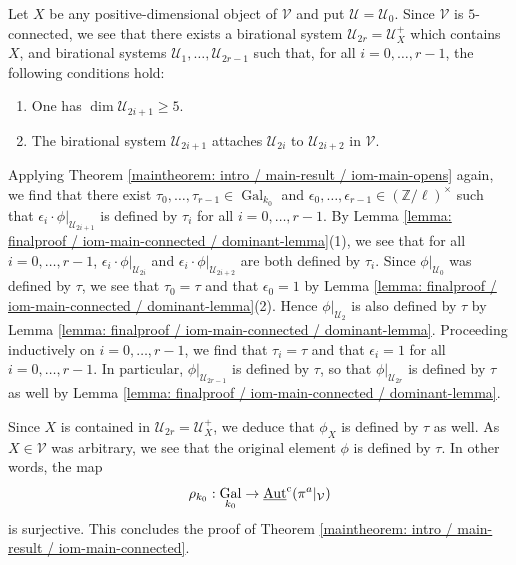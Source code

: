 \documentclass[11pt]{amsart}
\theoremstyle{definition}
\theoremstyle{remark}
\numberwithin{equation}{section}
\DeclareMathOperator{\Aut}{Aut}
\DeclareMathOperator{\Gal}{Gal}
\newcommand{\Z}{\mathbb{Z}}
\newcommand{\Vc}{\mathcal{V}}
\newcommand{\Ucal}{\mathcal{U}}
\newcommand{\UAutc}{\underline{\Aut}^{\rm c}}
\newcommand{\Galk}{{\Gal_{k_0}}}
\begin{document}
Let $X$ be any positive-dimensional object of $\Vc$ and put $\Ucal = \Ucal_0$.
Since $\Vc$ is $5$-connected, we see that there exists a birational system $\Ucal_{2r} = \Ucal_X^+$ which contains $X$, and birational systems $\Ucal_1,\ldots,\Ucal_{2r-1}$ such that, for all $i = 0,\ldots,r-1$, the following conditions hold:
\begin{enumerate}
  \item One has $\dim \Ucal_{2i+1} \geq 5$. 
  \item The birational system $\Ucal_{2i+1}$ attaches $\Ucal_{2i}$ to $\Ucal_{2i+2}$ in $\Vc$.
\end{enumerate}
Applying Theorem \ref{maintheorem: intro / main-result / iom-main-opens} again, we find that there exist $\tau_0,\ldots,\tau_{r-1} \in \Galk$ and $\epsilon_0,\ldots,\epsilon_{r-1} \in (\Z/\ell)^\times$ such that $\epsilon_i \cdot \phi|_{\Ucal_{2i+1}}$ is defined by $\tau_i$ for all $i = 0,\ldots,r-1$.
By Lemma \ref{lemma: finalproof / iom-main-connected / dominant-lemma}(1), we see that for all $i = 0,\ldots,r-1$, $\epsilon_i \cdot \phi|_{\Ucal_{2i}}$ and $\epsilon_i \cdot \phi|_{\Ucal_{2i+2}}$ are both defined by $\tau_i$.
Since $\phi|_{\Ucal_0}$ was defined by $\tau$, we see that $\tau_0 = \tau$ and that $\epsilon_0 = 1$ by Lemma \ref{lemma: finalproof / iom-main-connected / dominant-lemma}(2).
Hence $\phi|_{\Ucal_2}$ is also defined by $\tau$ by Lemma \ref{lemma: finalproof / iom-main-connected / dominant-lemma}.
Proceeding inductively on $i = 0,\ldots,r-1$, we find that $\tau_i = \tau$ and that $\epsilon_i = 1$ for all $i = 0,\ldots,r-1$.
In particular, $\phi|_{\Ucal_{2r-1}}$ is defined by $\tau$, so that $\phi|_{\Ucal_{2r}}$ is defined by $\tau$ as well by Lemma \ref{lemma: finalproof / iom-main-connected / dominant-lemma}.

Since $X$ is contained in $\Ucal_{2r} = \Ucal_X^+$, we deduce that $\phi_X$ is defined by $\tau$ as well.
As $X \in \Vc$ was arbitrary, we see that the original element $\phi$ is defined by $\tau$.
In other words, the map
\[ \rho_{k_0} : \Galk \rightarrow \UAutc(\pi^a|_\Vc) \]
is surjective.
This concludes the proof of Theorem \ref{maintheorem: intro / main-result / iom-main-connected}.


%

\end{document}

